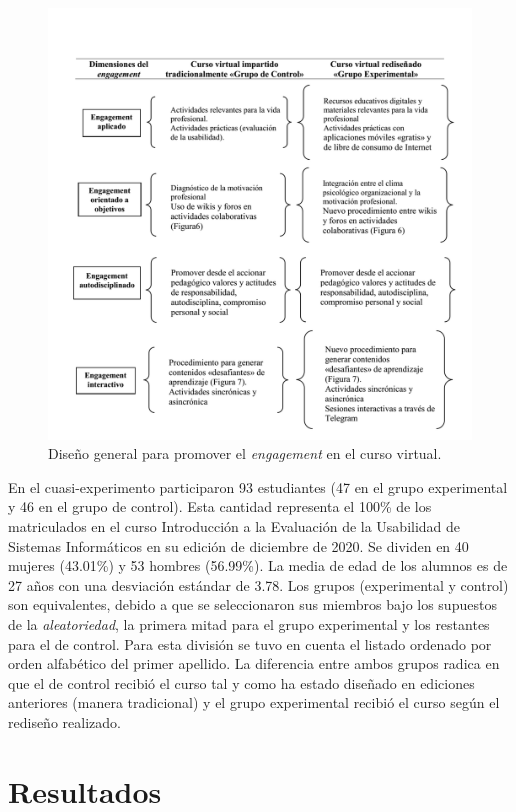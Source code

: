 \documentclass[spanish]{textolivre}
\begin{document}
\begin{figure}[htbp]
 \centering
 \includegraphics[width=1\textwidth]{fig3.png}
 \caption{Diseño general para promover el \emph{engagement} en el curso virtual.}
 \label{fig3}
\end{figure}

En el cuasi-experimento participaron 93 estudiantes (47 en el grupo experimental y 46 en el grupo de control). Esta cantidad representa el 100\% de los matriculados en el curso Introducción a la Evaluación de la Usabilidad de Sistemas Informáticos en su edición de diciembre de 2020. Se dividen en 40 mujeres (43.01\%) y 53 hombres (56.99\%). La media de edad de los alumnos es de 27 años con una desviación estándar de 3.78. Los grupos (experimental y control) son equivalentes, debido a que se seleccionaron sus miembros bajo los supuestos de la \emph{aleatoriedad}, la primera mitad para el grupo experimental y los restantes para el de control. Para esta división se tuvo en cuenta el listado ordenado por orden alfabético del primer apellido. La diferencia entre ambos grupos radica en que el de control recibió el curso tal y como ha estado diseñado en ediciones anteriores (manera tradicional) y el grupo experimental recibió el curso según el rediseño realizado.

\section{Resultados}
\end{document}
